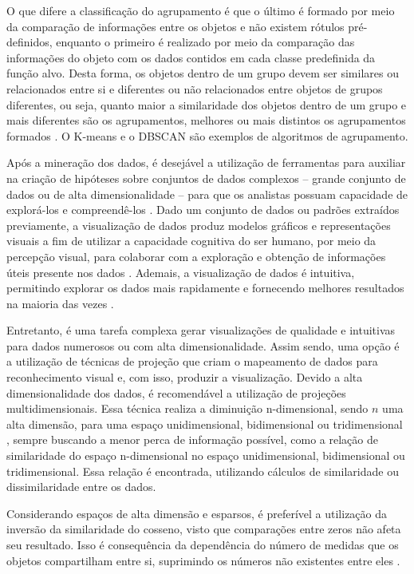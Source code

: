 		O que difere a classificação do agrupamento é que o último é formado por meio da
		comparação de informações entre os objetos e não existem rótulos pré-definidos,
		enquanto o primeiro é realizado por meio da comparação das informações do objeto
		com os dados contidos em cada classe predefinida da função alvo. Desta forma,
		os objetos dentro de um grupo devem ser similares ou relacionados entre si e
		diferentes ou não relacionados entre objetos de grupos diferentes, ou seja,
		quanto maior a similaridade dos objetos dentro de um grupo e mais diferentes
		são os agrupamentos, melhores ou mais distintos os agrupamentos formados \cite{Tan:2005:ch8}.
		O K-means \cite{macqueen1967} e o \ac{DBSCAN} \cite{Ester1996} são exemplos de
		algoritmos de agrupamento.

		Após a mineração dos dados, é desejável a utilização de ferramentas para
		auxiliar na criação de hipóteses sobre conjuntos de dados complexos -- grande
		conjunto de dados ou de alta dimensionalidade -- para que os analistas possuam
		capacidade de explorá-los e compreendê-los \cite{de2003}. Dado um conjunto de
		dados ou padrões extraídos previamente, a visualização de dados
		produz modelos gráficos e representações visuais a fim de utilizar a capacidade
		cognitiva do ser humano, por meio da percepção visual, para colaborar com
		a exploração e obtenção de informações úteis presente nos dados \cite{de2003,keim2002}.
		Ademais, a visualização de dados é intuitiva, permitindo explorar os dados
		mais rapidamente e fornecendo melhores resultados na maioria das vezes \cite{keim2002}.
		
		Entretanto, é uma tarefa complexa gerar visualizações de qualidade e intuitivas para
		dados numerosos ou com alta dimensionalidade. Assim sendo, uma opção é a utilização
		de técnicas de projeção que criam o mapeamento de dados para reconhecimento visual
		\cite{friedman1974} e, com isso, produzir a visualização. Devido a alta dimensionalidade
		dos dados, é recomendável a utilização de projeções multidimensionais. Essa técnica
		realiza a diminuição n-dimensional, sendo $n$ uma alta dimensão, para uma espaço
		unidimensional, bidimensional ou tridimensional \cite{paulovich2008least},
		sempre buscando a menor perca de informação possível, como a relação de
		similaridade do espaço n-dimensional no espaço unidimensional, bidimensional
		ou tridimensional. Essa relação é encontrada, utilizando cálculos de similaridade
		ou dissimilaridade entre os dados.
		
		Considerando espaços de alta dimensão e esparsos, é preferível a utilização
		da inversão da similaridade do cosseno, visto que comparações entre zeros
		não afeta seu resultado. Isso é consequência da dependência do número
		de medidas que os objetos compartilham entre si, suprimindo os números
		não existentes entre eles \cite{phd:paulovich}.
		
